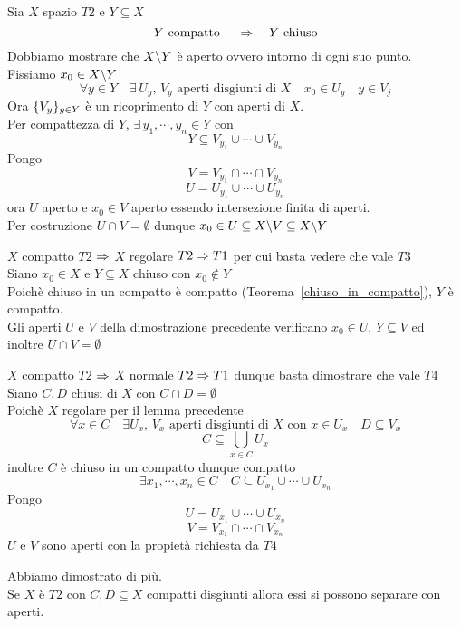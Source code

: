 \begin{thm}Sia $X$ spazio $T2$ e $ Y \subseteq X$
$$ Y \text{ compatto } \quad \Rightarrow \quad Y \text{ chiuso}$$
\proof Dobbiamo mostrare che $X\backslash Y$ \`e aperto ovvero intorno di ogni suo punto.\\
Fissiamo $x_0 \in X \backslash Y$ 
$$ \forall y \in Y \quad \exists \, U_y, \, V_y \text{ aperti  disgiunti di } X \quad x_0 \in U_y \quad y \in V_j $$
Ora $\displaystyle \{ V_y\}_{y\in Y}$ \`e un ricoprimento di $Y$ con aperti di $X$.\\
Per compattezza di $Y$, $\exists \, y_1, \cdots , y_n \in Y$ con
$$Y \subseteq V_{y_1}\cup \cdots \cup V_{y_n}$$
Pongo  $$ V = V_{y_1}\cap \cdots \cap V_{y_n}$$
$$ U = U_{y_1}\cup \cdots \cup U_{y_n}$$
ora $U$ aperto e $x_0\in V$ aperto essendo intersezione finita di aperti.\\
Per costruzione $U \cap V =\emptyset$ dunque 
$x_0 \in U \subseteq X \backslash V \subseteq X\backslash Y$
\end{thm}

\begin{lem}$X$ compatto $T2$ $\Rightarrow$ $X$ regolare
\proof $T2 \Rightarrow T1$ per cui basta vedere che vale $T3$\\
Siano $x_0 \in X$ e $Y\subseteq X $ chiuso con $x_0 \not \in Y$\\
Poich\`e chiuso in un compatto \`e compatto (Teorema~\ref{chiuso_in_compatto}), $Y$ \`e compatto.\\
Gli aperti $U$ e $V$ della dimostrazione precedente verificano $x_0 \in U$,  $Y \subseteq V $ ed inoltre $U\cap V =\emptyset$
\endproof
\end{lem}
\begin{thm}$X$ compatto $T2$ $\Rightarrow$ $X$ normale
\proof $T2\Rightarrow T1$ dunque basta dimostrare che vale $T4$\\
Siano $C,D$ chiusi di $X$ con $C\cap D=\emptyset$ \\
Poich\`e $X$ regolare per il lemma precedente 
$$ \forall x\in C \quad \exists U_x,\, V_x \text{ aperti disgiunti di } X \text{ con } x \in U_x \quad D \subseteq V_x $$
$$ C \subseteq \bigcup_{x \in C } U_x $$
inoltre $C$ \`e chiuso in un compatto dunque compatto 
$$ \exists x_1, \cdots , x_n \in C \quad C \subseteq U_{x_1} \cup \cdots \cup U_{x_n }$$
Pongo
$$U = U_{x_1} \cup \cdots \cup U_{x_n}$$
$$V = V_{x_1} \cap \cdots \cap V_{x_n}$$
$U$ e $V$ sono aperti con la propiet\`a richiesta da $T4$ 
\endproof
\end{thm}
\begin{oss}Abbiamo dimostrato di pi\`u.\\
Se $X$ \`e $T2$ con $C,D\subseteq X $ compatti disgiunti allora essi si possono separare con aperti.
\end{oss}
